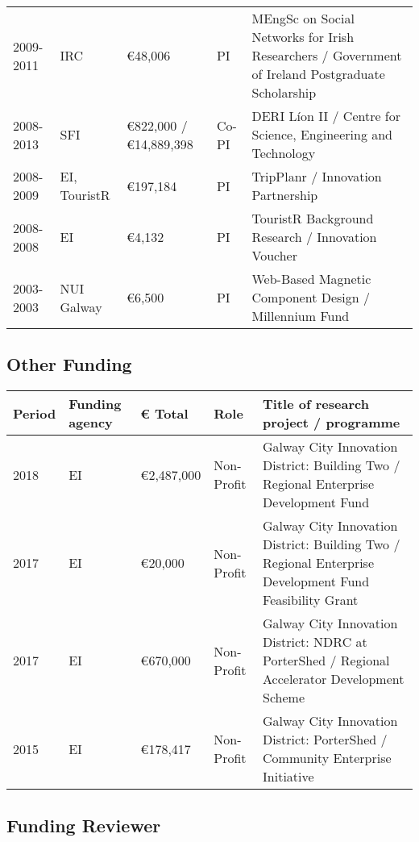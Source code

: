 \documentclass[10pt,a4paper]{res} %
\begin{document}
\begin{resume}
\begin{longtable}{ p{2 cm} | p{2 cm} | p{2 cm} | p{2 cm} | p{7 cm} }
2009-2011 & IRC & \euro{}48,006 & PI & MEngSc on Social Networks for Irish Researchers / Government of Ireland Postgraduate Scholarship \\
2008-2013 & SFI & \euro{}822,000 / \euro{}14,889,398 & Co-PI & DERI L\'{i}on II / Centre for Science, Engineering and Technology \\
2008-2009 & EI, TouristR & \euro{}197,184 & PI & TripPlanr / Innovation Partnership \\
2008-2008 & EI & \euro{}4,132 & PI & TouristR Background Research / Innovation Voucher \\
2003-2003 & NUI Galway & \euro{}6,500 & PI & Web-Based Magnetic Component Design / Millennium Fund \\
\end{longtable}

\subsection*{Other Funding}

\begin{tabular}{ p{2 cm} | p{2 cm} | p{2 cm} | p{2 cm} | p{7 cm} }
Period & Funding agency & \euro{} Total & Role & Title of research project / programme \\
\hline
2018 & EI & \euro{}2,487,000 & Non-Profit & Galway City Innovation District: Building Two / Regional Enterprise Development Fund \\
2017 & EI & \euro{}20,000 & Non-Profit & Galway City Innovation District: Building Two / Regional Enterprise Development Fund Feasibility Grant \\
2017 & EI & \euro{}670,000 & Non-Profit & Galway City Innovation District: NDRC at PorterShed / Regional Accelerator Development Scheme \\
2015 & EI & \euro{}178,417 & Non-Profit & Galway City Innovation District: PorterShed / Community Enterprise Initiative \\
\end{tabular}

\subsection*{Funding Reviewer}


\end{resume}
\end{document}
